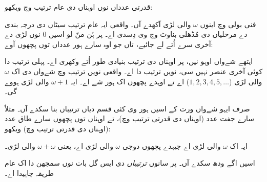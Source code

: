 \documentclass[../../../include/open-logic-section]{subfiles}
\begin{document}

قدرتی عدداں نوں اوہناں دی عام ترتیب وچ ویکھو:
\begin{center}
\end{center}
فنی بولی وچ اینوں $\omega$ والی لڑی آکھدے آں۔ واقعی ایہ عام ترتیب سیٹاں
دی درجہ بندی دے مرحلیاں دی مُڈھلی بناوٹ وچ وی دِسدی اے۔ پر ہُن منّ لو اسیں
$0$ نوں لڑی دے آخری سرے اُتے لے جائیے، تاں جو اوہ سارے ہور عدداں توں
پچھوں آوے:
\begin{center}
\end{center}
ایتھے شےواں اوہو نیں، پر اوہناں دی ترتیب بنیادی طور اُتے وکھری اے۔
پہلی ترتیب دا کوئی آخری عنصر نہیں سی، نویں ترتیب دا اے۔ واقعی نویں
ترتیب وچ شےواں دی اک $\omega$ والی لڑی ($1, 2, 3, 4, 5, \ldots$) اے
تے اوہدے پچھوں اک ہور شے اے۔ ایہ $\omega+1$ والی لڑی ہووے گی۔

صرف ایہو شےواں ورت کے اسیں ہور وی کئی قسم دیاں ترتیباں بنا سکدے آں۔
مثلاً سارے جفت عدد (اوہناں دی قدرتی ترتیب وچ)، تے اوہناں توں پچھوں
سارے طاق عدد (اوہناں دی قدرتی ترتیب وچ) ویکھو:
\begin{center}
\end{center}
ایہ اک $\omega$ والی لڑی اے جیہدے پچھوں دوجی $\omega$ والی لڑی اے،
یعنی $\omega+\omega$ والی لڑی۔

اسیں اگے ودھ سکدے آں۔ پر سانوں \emph{ترتیباں} دی ایس گل بات نوں
سمجھن دا اک عام طریقہ چاہیدا اے۔
\end{document}
